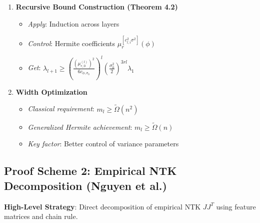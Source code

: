\documentclass{article}
\begin{document}
\begin{enumerate}
    \item \textbf{Recursive Bound Construction (Theorem 4.2)}
    \begin{itemize}
        \item \textit{Apply}: Induction across layers
        \item \textit{Control}: Hermite coefficients $\mu_r^{[c_{l,i}^2 \sigma^2]}(\phi)$
        \item \textit{Get}: $\lambda_{l+1} \geq \left(\frac{(\mu_{r,0}^{(l)})^2}{6 c_{\phi,\sigma_0}}\right)^l \left(\frac{\sigma_0^2}{2}\right)^{3rl} \lambda_1$
    \end{itemize}
    
    \item \textbf{Width Optimization}
    \begin{itemize}
        \item \textit{Classical requirement}: $m_l \geq \tilde{\Omega}(n^2)$
        \item \textit{Generalized Hermite achievement}: $m_l \geq \tilde{\Omega}(n)$
        \item \textit{Key factor}: Better control of variance parameters
    \end{itemize}
\end{enumerate}

\subsection{Proof Scheme 2: Empirical NTK Decomposition (Nguyen et al.)}

\textbf{High-Level Strategy}: Direct decomposition of empirical NTK $JJ^T$ using feature matrices and chain rule.
\end{document}
